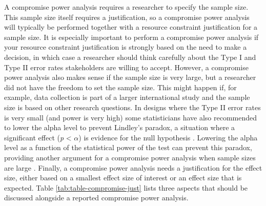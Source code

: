 \documentclass[
]{krantz}
\begin{document}
A compromise power analysis requires a researcher to specify the sample size. This sample size itself requires a justification, so a compromise power analysis will typically be performed together with a resource constraint justification for a sample size. It is especially important to perform a compromise power analysis if your resource constraint justification is strongly based on the need to make a decision, in which case a researcher should think carefully about the Type I and Type II error rates stakeholders are willing to accept. However, a compromise power analysis also makes sense if the sample size is very large, but a researcher did not have the freedom to set the sample size. This might happen if, for example, data collection is part of a larger international study and the sample size is based on other research questions. In designs where the Type II error rates is very small (and power is very high) some statisticians have also recommended to lower the alpha level to prevent Lindley's paradox, a situation where a significant effect (\emph{p} \textless{} \(\alpha\)) is evidence for the null hypothesis \citep{jeffreys_theory_1939, good_bayesnon-bayes_1992}. Lowering the alpha level as a function of the statistical power of the test can prevent this paradox, providing another argument for a compromise power analysis when sample sizes are large \citep{maier_justify_2022}. Finally, a compromise power analysis needs a justification for the effect size, either based on a smallest effect size of interest or an effect size that is expected. Table \ref{tab:table-compromise-just} lists three aspects that should be discussed alongside a reported compromise power analysis.
\end{document}
